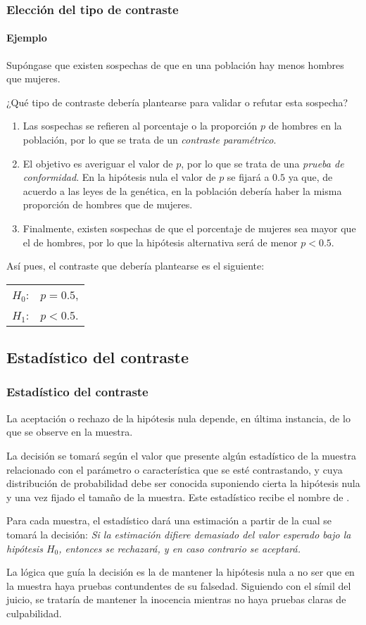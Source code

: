 \begin{frame}
\frametitle{Elección del tipo de contraste}
\framesubtitle{Ejemplo}
Supóngase que existen sospechas de que en una población hay menos hombres que mujeres. 

¿Qué tipo de contraste debería plantearse para validar o refutar esta sospecha?
\begin{enumerate}
\item Las sospechas se refieren al porcentaje o la proporción $p$ de hombres en la
población, por lo que se trata de un \emph{contraste paramétrico}.
\item El objetivo es averiguar el valor de $p$, por lo que se trata de una \emph{prueba de conformidad}. En la
hipótesis nula el valor de $p$ se fijará a $0.5$ ya que, de acuerdo a las leyes de la genética, en la población debería
haber la misma proporción de hombres que de mujeres.
\item Finalmente, existen sospechas de que el porcentaje de mujeres sea mayor que el de hombres, por lo que la
hipótesis alternativa será de menor $p<0.5$.
\end{enumerate}

Así pues, el contraste que debería plantearse es el siguiente:
\begin{center}
\begin{tabular}{ll}
$H_0$: & $p=0.5$,\\
$H_1$: & $p<0.5$.
\end{tabular}
\end{center}
\end{frame}


\subsection{Estadístico del contraste}
\begin{frame}
\frametitle{Estadístico del contraste}
La aceptación o rechazo de la hipótesis nula depende, en última instancia, de lo que se observe en la muestra.

La decisión se tomará según el valor que presente algún estadístico de la muestra relacionado con el parámetro o
característica que se esté contrastando, y cuya distribución de probabilidad debe ser conocida suponiendo cierta la
hipótesis nula y una vez fijado el tamaño de la muestra.
Este estadístico recibe el nombre de .

Para cada muestra, el estadístico dará una estimación a partir de la cual se tomará la decisión: \alert{\emph{Si la
estimación difiere demasiado del valor esperado bajo la hipótesis $H_0$, entonces se rechazará, y en caso contrario se
aceptará.}}

La lógica que guía la decisión es la de mantener la hipótesis nula a no ser que en la muestra haya pruebas contundentes
de su falsedad. Siguiendo con el símil del juicio, se trataría de mantener la inocencia mientras no haya pruebas claras
de culpabilidad.
\end{frame}


